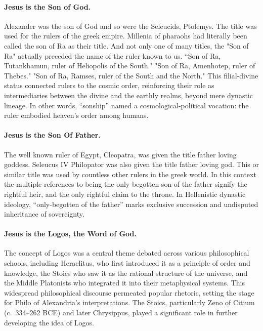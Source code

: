 \paragraph{Jesus is the Son of God.}\label{par:jesus-is-the-son-of-god.}
Alexander was the son of God and so were the Seleucids, Ptolemys.
The title was used for the rulers of the greek empire.
Millenia of pharaohs had literally been called the son of Ra as their title.
And not only one of many titles, the "Son of Ra" actually preceded the name of the ruler known to us.
“Son of Ra, Tutankhamun, ruler of Heliopolis of the South."
"Son of Ra, Amenhotep, ruler of Thebes."
"Son of Ra, Ramses, ruler of the South and the North."
This filial-divine status connected rulers to the cosmic order, reinforcing their role as intermediaries between the divine and the earthly realms, beyond mere dynastic lineage.
In other words, “sonship” named a cosmological-political vocation: the ruler embodied heaven’s order among humans.

\paragraph{Jesus is the Son Of Father.}\label{par:jesus-is-the-son-of-father.}

The well known ruler of Egypt, Cleopatra, was given the title father loving goddess.
Seleucus IV Philopator was also given the title father loving god.
This or similar title was used by countless other rulers in the greek world.
In this context the multiple references to being the only-begotten son of the father signify the rightful heir, and the only rightful claim to the throne.
In Hellenistic dynastic ideology, “only-begotten of the father” marks exclusive succession and undisputed inheritance of sovereignty.

\paragraph{Jesus is the Logos, the Word of God.}\label{par:jesus-is-the-logos-the-word-of-god.}
The concept of Logos was a central theme debated across various philosophical schools, including Heraclitus, who first introduced it as a principle of order and knowledge, the Stoics who saw it as the rational structure of the universe, and the Middle Platonists who integrated it into their metaphysical systems.
This widespread philosophical discourse permeated popular rhetoric, setting the stage for Philo of Alexandria’s interpretations.
The Stoics, particularly Zeno of Citium (c.~334–262 BCE) and later Chrysippus, played a significant role in further developing the idea of Logos.

